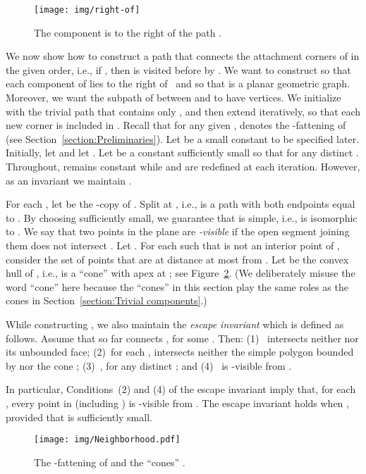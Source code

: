 \documentclass[11pt]{patmorin}
\begin{document}
\begin{figure}
\centering
  \texttt{[image: img/right-of]}
  \caption{The component  is to the right of the path .}
   \label{figure:right-of}
\end{figure}

We now show how to construct a path  that connects the attachment corners of  in the given order, i.e., if , then  is visited before  by . We want to construct  so that each component  of  lies to the right of~ and so that  is a planar geometric graph.
Moreover, we want the subpath of  between  and  to have  vertices. 
We initialize  with the trivial path that contains only , and then extend  iteratively, so that each new corner  is included in .
Recall that  for any given ,  denotes the -fattening of  (see Section~\ref{section:Preliminaries}).
Let  be a small constant to be specified later.
Initially, let  and let . Let  be a constant sufficiently small so that  for any distinct .
Throughout,  remains constant while  and  are redefined at each iteration. However, as an invariant we maintain .

For each , let  be the -copy of  .
Split  at , i.e.,  is a path with both endpoints equal to .
By choosing  sufficiently small, we guarantee that  is simple, i.e.,  is isomorphic to .
We say that two points in the plane are \emph{-visible} if the open segment joining them does not intersect .
Let . For each  such that  is not an interior point of , consider the set of points  that are at distance at most  from .
Let  be the convex hull of , i.e.,  is a ``cone'' with apex at ; see Figure~\ref{fig:Neighborhood}. (We deliberately misuse the word ``cone'' here because the ``cones''  in this section play the same roles as the cones  in Section~\ref{section:Trivial components}.)


While constructing , we also maintain the \emph{escape invariant} which is defined as follows. Assume that  so far connects , for some . Then: (1)~ intersects neither  nor its unbounded face; (2)~for each ,  intersects neither the simple polygon bounded by  nor the cone ; (3)~, for any distinct ; and (4)~ is -visible from .

In particular, Conditions~(2) and (4) of the escape invariant imply that, for
each , every point in  (including ) is
-visible from .  The escape invariant holds when ,
provided that  is sufficiently small.

\begin{figure}[tb]
\centering
\texttt{[image: img/Neighborhood.pdf]}
\caption{The -fattening of  and the ``cones'' .}
\label{fig:Neighborhood}
\end{figure}
\end{document}
